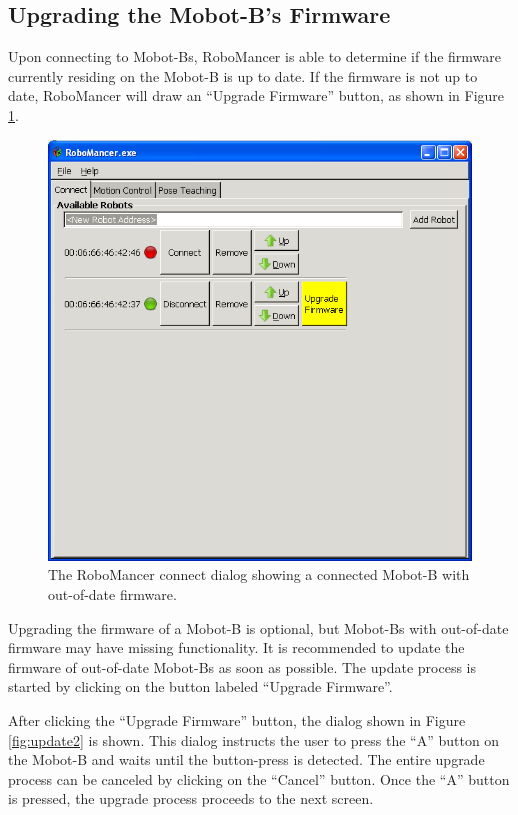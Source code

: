\documentclass{article}
\begin{document}
\subsection{Upgrading the Mobot-B's Firmware}
Upon connecting to Mobot-Bs, RoboMancer is able to determine if the firmware 
currently residing on the Mobot-B is up to date. If the firmware is not up to 
date, RoboMancer will draw an ``Upgrade Firmware'' button, as shown in 
Figure \ref{fig:update1}. 

\begin{figure}[H]
\begin{center}
\includegraphics[width=4.5in]{images/update1.png}
\end{center}
\caption{\label{fig:update1} The RoboMancer connect dialog showing a connected
Mobot-B with out-of-date firmware.}
\end{figure}

Upgrading the firmware of a Mobot-B is optional, but Mobot-Bs with out-of-date firmware
may have missing functionality. It is recommended to update the firmware of
out-of-date Mobot-Bs as soon as possible. The update process is started by
clicking on the button labeled ``Upgrade Firmware''. 

After clicking the ``Upgrade Firmware'' button, the dialog shown in Figure
\ref{fig:update2} is shown. This dialog instructs the user to press the ``A''
button on the Mobot-B and waits until the button-press is detected. The 
entire upgrade process can be canceled by clicking on the ``Cancel'' button.
Once the ``A'' button is pressed, the upgrade process proceeds to the next screen.
\end{document}

